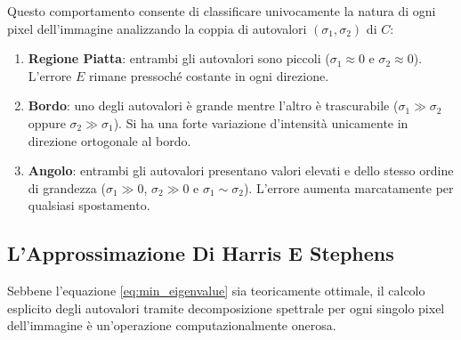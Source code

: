 ﻿\documentclass[11pt, a4paper]{article}
\begin{document}
Questo comportamento consente di classificare univocamente la natura di ogni pixel dell'immagine analizzando la coppia di autovalori $(\sigma_1, \sigma_2)$ di $C$:


\begin{enumerate}
    \item \textbf{Regione Piatta}: entrambi gli autovalori sono piccoli ($\sigma_1 \approx 0$ e $\sigma_2 \approx 0$). L'errore $E$ rimane pressoché costante in ogni direzione.
    \item \textbf{Bordo}: uno degli autovalori è grande mentre l'altro è trascurabile ($\sigma_1 \gg \sigma_2$ oppure $\sigma_2 \gg \sigma_1$). Si ha una forte variazione d'intensità unicamente in direzione ortogonale al bordo.
    \item \textbf{Angolo}: entrambi gli autovalori presentano valori elevati e dello stesso ordine di grandezza ($\sigma_1 \gg 0$, $\sigma_2 \gg 0$ e $\sigma_1 \sim \sigma_2$). L'errore aumenta marcatamente per qualsiasi spostamento.
\end{enumerate}

\subsection{L'Approssimazione Di Harris E Stephens}

Sebbene l'equazione \eqref{eq:min_eigenvalue} sia teoricamente ottimale, il calcolo esplicito degli autovalori tramite decomposizione spettrale per ogni singolo pixel dell'immagine è un'operazione computazionalmente onerosa.
\end{document}
